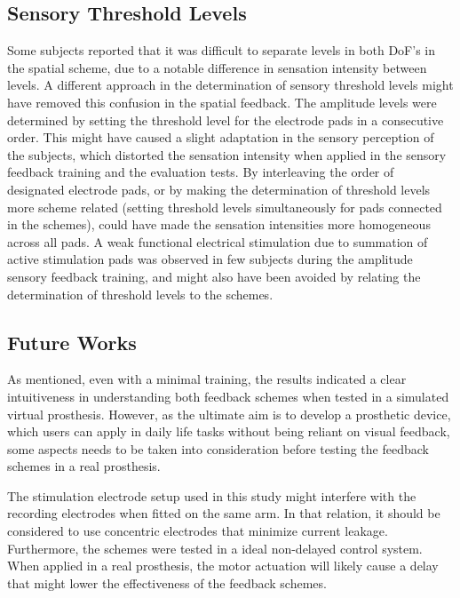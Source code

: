 \subsection{Sensory Threshold Levels}
Some subjects reported that it was difficult to separate levels in both DoF's in the spatial scheme, due to a notable difference in sensation intensity between levels. A different approach in the determination of sensory threshold levels might have removed this confusion in the spatial feedback. The amplitude levels were determined by setting the threshold level for the electrode pads in a consecutive order. This might have caused a slight adaptation in the sensory perception of the subjects, which distorted the sensation intensity when applied in the sensory feedback training and the evaluation tests. By interleaving the order of designated electrode pads, or by making the determination of threshold levels more scheme related (setting threshold levels simultaneously for pads connected in the schemes), could have made the sensation intensities more homogeneous across all pads. A weak functional electrical stimulation due to summation of active stimulation pads was observed in few subjects during the amplitude sensory feedback training, and might also have been avoided by relating the determination of threshold levels to the schemes. 

\subsection{Future Works}
As mentioned, even with a minimal training, the results indicated a clear intuitiveness in understanding both feedback schemes when tested in a simulated virtual prosthesis. However, as the ultimate aim is to develop a prosthetic device, which users can apply in daily life tasks without being reliant on visual feedback, some aspects needs to be taken into consideration before testing the feedback schemes in a real prosthesis. 

The stimulation electrode setup used in this study might interfere with the recording electrodes when fitted on the same arm. In that relation, it should be considered to use concentric electrodes that minimize current leakage. Furthermore, the schemes were tested in a ideal non-delayed control system. When applied in a real prosthesis, the motor actuation will likely cause a delay that might lower the effectiveness of the feedback schemes.   

